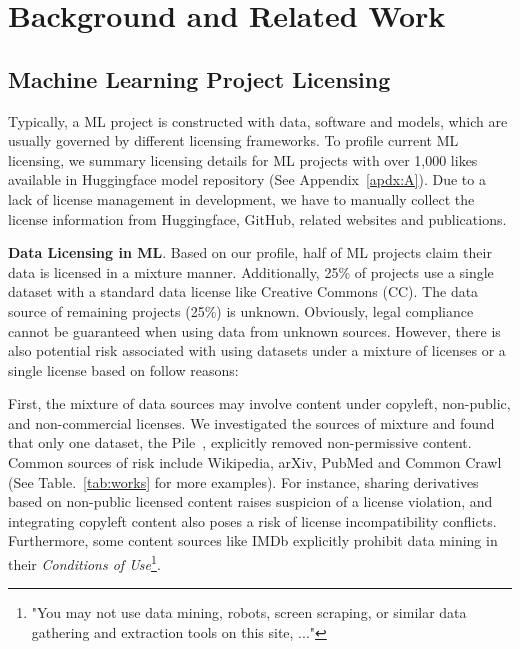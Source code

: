 \section{Background and Related Work}
\label{sec:related}

\subsection{Machine Learning Project Licensing}
Typically, a ML project is constructed with data, software and models, which are usually governed by different licensing frameworks.
To profile current ML licensing, we summary licensing details for ML projects with over 1,000 likes available in Huggingface model repository (See Appendix~\ref{apdx:A}).
Due to a lack of license management in development, we have to manually collect the license information from Huggingface, GitHub, related websites and publications.

\textbf{Data Licensing in ML}.
Based on our profile, half of ML projects claim their data is licensed in a mixture manner.
Additionally, 25\% of projects use a single dataset with a standard data license like Creative Commons (CC).
The data source of remaining projects (25\%) is unknown.
Obviously, legal compliance cannot be guaranteed when using data from unknown sources. 
However, there is also potential risk associated with using datasets under a mixture of licenses or a single license based on follow reasons:

First, the mixture of data sources may involve content under copyleft, non-public, and non-commercial licenses. 
We investigated the sources of mixture and found that only one dataset, the Pile~\cite{gao2020the}, explicitly removed non-permissive content.
Common sources of risk include Wikipedia, arXiv, PubMed and Common Crawl~\cite{henderson2023foundation} (See Table.~\ref{tab:works} for more examples).
For instance, sharing derivatives based on non-public licensed content raises suspicion of a license violation, and integrating copyleft content also poses a risk of license incompatibility conflicts.
Furthermore, some content sources like IMDb explicitly prohibit data mining in their \textit{Conditions of Use}\footnote{"You may not use data mining, robots, screen scraping, or similar data gathering and extraction tools on this site, ..."}.

